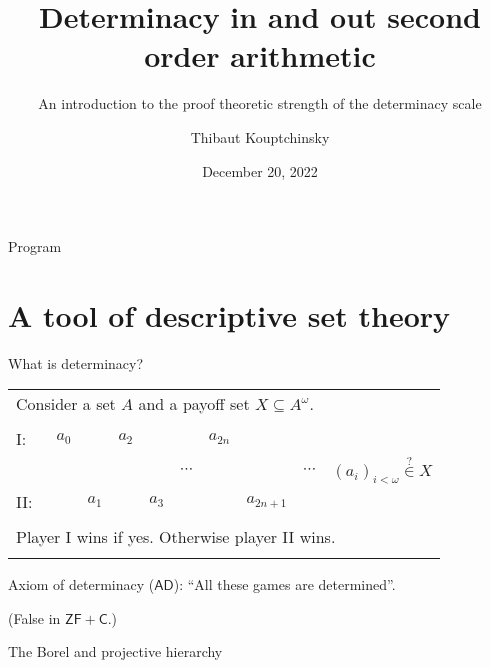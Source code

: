 \documentclass{beamer} %
\title[Determinacy axioms]{Determinacy in and out second order arithmetic}
\subtitle[]{An introduction to the proof theoretic strength of the determinacy scale}
\institute[Proof Theory Conference]{Proof Theory Conference \and UCLouvain}
\author{Thibaut Kouptchinsky}
\date{December 20, 2022}
\begin{document}
\begin{frame}
	\titlepage
\end{frame}


\begin{frame}{Program}
    \tableofcontents
\end{frame}

\section{A tool of descriptive set theory}

\begin{frame}{What is determinacy?}
    
    \begin{tabular}{llllllllll}
        \multicolumn{10}{l}{Consider a set $A$ and a payoff set $X \subseteq A^{\omega}$.}\\
        &&&&&&&&&\\
        I:\ & $a_0$ &       & $a_2$ &       &          &$a_{2n}$   &           & & \\
            &       &       &       &       & $\cdots$ &           &           & $\cdots$ & \qquad ${(a_i)}_{i < \omega} \overset{?}{\in} X$\\
        II:\ &       & $a_1$ &       & $a_3$ &          &           &$a_{2n+1}$ & & \\
        &&&&&&&&&\\
        \multicolumn{10}{l}{Player I wins if yes. Otherwise player II wins.} \\ 
        &&&&&&&&&\\
    \end{tabular}

    Axiom of determinacy ($\mathsf{AD}$): ``All these games are determined''.
    
    (False in $\mathsf{ZF + C}$.)
\end{frame}


\begin{frame}{The Borel and projective hierarchy}
    
\end{frame}

\end{document}
